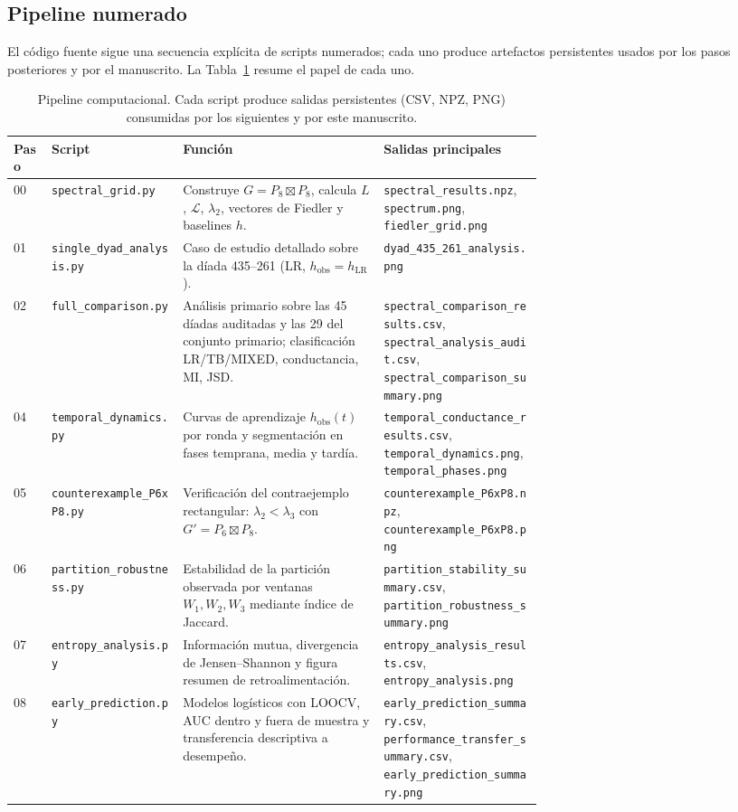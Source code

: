 \documentclass[journal]{IEEEtran}
\begin{document}
\subsection{Pipeline numerado}

El código fuente sigue una secuencia explícita de scripts numerados; cada uno produce artefactos persistentes usados por los pasos posteriores y por el manuscrito. La Tabla~\ref{tab:pipeline} resume el papel de cada uno.

\begin{table}[t]
\centering
\scriptsize
\caption{Pipeline computacional. Cada script produce salidas persistentes (CSV, NPZ, PNG) consumidas por los siguientes y por este manuscrito.}
\label{tab:pipeline}
\begin{tabular}{@{}llp{0.38\linewidth}p{0.30\linewidth}@{}}
\toprule
\textbf{Paso} & \textbf{Script} & \textbf{Función} & \textbf{Salidas principales} \\
\midrule
00 & \texttt{spectral\_grid.py}        & Construye $G = P_8 \boxtimes P_8$, calcula $L$, $\mathcal{L}$, $\lambda_2$, vectores de Fiedler y baselines $h$. & \texttt{spectral\_results.npz}, \texttt{spectrum.png}, \texttt{fiedler\_grid.png} \\
01 & \texttt{single\_dyad\_analysis.py} & Caso de estudio detallado sobre la díada 435--261 (LR, $h_{\mathrm{obs}}=h_{\mathrm{LR}}$). & \texttt{dyad\_435\_261\_analysis.png} \\
02 & \texttt{full\_comparison.py}      & Análisis primario sobre las 45 díadas auditadas y las 29 del conjunto primario; clasificación LR/TB/MIXED, conductancia, MI, JSD. & \texttt{spectral\_comparison\_results.csv}, \texttt{spectral\_analysis\_audit.csv}, \texttt{spectral\_comparison\_summary.png} \\
04 & \texttt{temporal\_dynamics.py}    & Curvas de aprendizaje $h_{\mathrm{obs}}(t)$ por ronda y segmentación en fases temprana, media y tardía. & \texttt{temporal\_conductance\_results.csv}, \texttt{temporal\_dynamics.png}, \texttt{temporal\_phases.png} \\
05 & \texttt{counterexample\_P6xP8.py} & Verificación del contraejemplo rectangular: $\lambda_2 < \lambda_3$ con $G' = P_6 \boxtimes P_8$. & \texttt{counterexample\_P6xP8.npz}, \texttt{counterexample\_P6xP8.png} \\
06 & \texttt{partition\_robustness.py} & Estabilidad de la partición observada por ventanas $W_1, W_2, W_3$ mediante índice de Jaccard. & \texttt{partition\_stability\_summary.csv}, \texttt{partition\_robustness\_summary.png} \\
07 & \texttt{entropy\_analysis.py}     & Información mutua, divergencia de Jensen--Shannon y figura resumen de retroalimentación. & \texttt{entropy\_analysis\_results.csv}, \texttt{entropy\_analysis.png} \\
08 & \texttt{early\_prediction.py}     & Modelos logísticos con LOOCV, AUC dentro y fuera de muestra y transferencia descriptiva a desempeño. & \texttt{early\_prediction\_summary.csv}, \texttt{performance\_transfer\_summary.csv}, \texttt{early\_prediction\_summary.png} \\
\bottomrule
\end{tabular}
\end{table}
\end{document}
